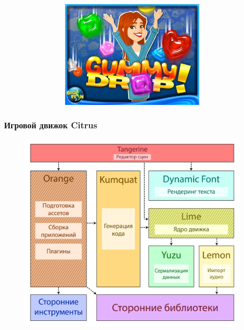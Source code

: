 \documentclass[10pt, unicode]{beamer}
\begin{document}
\begin{frame}
\begin{figure}[H]
\begin{subfigure}{0.49\linewidth}
\begin{subfigure}{\linewidth}
                    \includegraphics[scale=0.260]{GD.jpg}
                \end{subfigure}
            \end{subfigure}
        \end{figure}
    \end{frame}
    \begin{frame}
        \frametitle{Игровой движок Citrus}
        \begin{figure}
            \centering
            \includegraphics[width=\linewidth, height=.9\textheight, keepaspectratio]{CitrusArchitecture.png}
        \end{figure}
    \end{frame}
\end{document}
